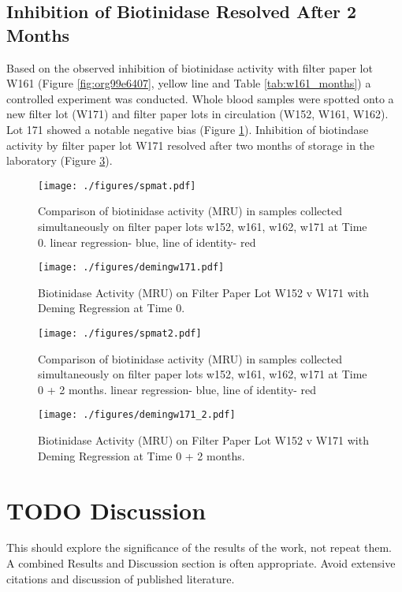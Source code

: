\documentclass[review]{elsarticle}
\begin{document}
\subsection*{Inhibition of Biotinidase Resolved After 2 Months}
\label{sec:org6aa610d}
Based on the observed inhibition of biotinidase activity with filter
paper lot W161 (Figure \ref{fig:org99e6407}, yellow line and Table
\ref{tab:w161_months}) a controlled experiment was conducted. Whole
blood samples were spotted onto a new filter lot (W171) and filter
paper lots in circulation (W152, W161, W162). Lot 171 showed a notable
negative bias (Figure \ref{fig:orgc4de0af}). Inhibition of biotindase activity by
filter paper lot W171 resolved after two months of storage in the
laboratory (Figure \ref{fig:org9b80348}).

\begin{figure}[htbp]
\centering
\texttt{[image: ./figures/spmat.pdf]}
\caption{\label{fig:orgc4de0af}Comparison of biotinidase activity (MRU) in samples collected simultaneously on filter paper lots w152, w161, w162, w171 at Time 0. linear regression- blue, line of identity- red}
\end{figure}

\begin{figure}[htbp]
\centering
\texttt{[image: ./figures/demingw171.pdf]}
\caption{\label{fig:org3046c67}Biotinidase Activity (MRU) on Filter Paper Lot W152 v W171 with Deming Regression at Time 0.}
\end{figure}
\clearpage

\begin{figure}[htbp]
\centering
\texttt{[image: ./figures/spmat2.pdf]}
\caption{\label{fig:org9b80348}Comparison of biotinidase activity (MRU) in samples collected simultaneously on filter paper lots w152, w161, w162, w171 at Time 0 + 2 months. linear regression- blue, line of identity- red}
\end{figure}

\begin{figure}[htbp]
\centering
\texttt{[image: ./figures/demingw171\_2.pdf]}
\caption{\label{fig:orgb98845e}Biotinidase Activity (MRU) on Filter Paper Lot W152 v W171 with Deming Regression at Time 0 + 2 months.}
\end{figure}

\clearpage


\section*{{\bfseries\sffamily TODO} Discussion}
\label{sec:org9b86281}
This should explore the significance of the results of the work, not
repeat them. A combined Results and Discussion section is often
appropriate. Avoid extensive citations and discussion of published
literature.
\end{document}
